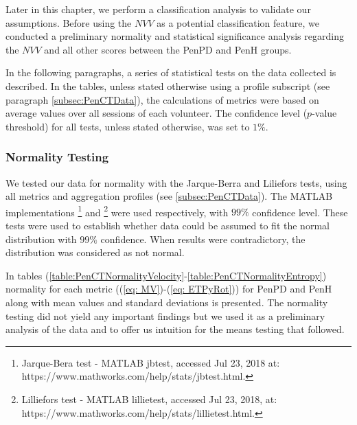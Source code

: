 Later in this chapter, we perform a classification analysis to validate our assumptions. Before using the $NVV$ as a potential classification feature, we conducted a preliminary normality and statistical significance analysis regarding the $NVV$ and all other scores between the \gls{PenPD} and \gls{PenH} groups. 

In the following paragraphs, a series of statistical tests on the data collected is described. In the tables, unless stated otherwise using a profile subscript (see paragraph \ref{subsec:PenCTData}), the calculations of metrics were based on average values over all sessions of each volunteer. The confidence level ($p$-value threshold) for all tests, unless stated otherwise, was set to $1\%$.

\subsubsection{Normality Testing}
\label{subsubsec:PenCTNormalityTesting}
We tested our data for normality with the Jarque-Berra and Liliefors tests, using all metrics and aggregation profiles (see \ref{subsec:PenCTData}). The MATLAB implementations \footnote{Jarque-Bera test - MATLAB jbtest, accessed Jul 23, 2018 at: https://www.mathworks.com/help/stats/jbtest.html.} and \footnote{Lilliefors test - MATLAB lillietest, accessed Jul 23, 2018, at: https://www.mathworks.com/help/stats/lillietest.html.} were used respectively, with $99\%$ confidence level. These tests were used to establish whether data could be assumed to fit the normal distribution with $99\%$ confidence. When results were contradictory, the distribution was considered as not normal. 

In tables (\ref{table:PenCTNormalityVelocity}-\ref{table:PenCTNormalityEntropy}) normality for each metric ((\ref{eq: MV})-(\ref{eq: ETPyRot})) for \gls{PenPD} and \gls{PenH} along with mean values and standard deviations is presented.
The normality testing did not yield any important findings but we used it as a preliminary analysis of the data and to offer us intuition for the means testing that followed. 

